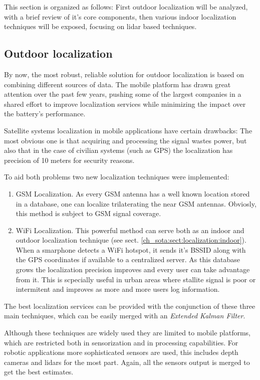     This section is organized as follows: First outdoor localization will be analyzed, with a brief review of it's core components, then various indoor localization techniques will be exposed, focusing on lidar based techniques.

    \subsection{Outdoor localization} \label{ch_sota:sect:localization:outdoor}

      By now, the most robust, reliable solution for outdoor localization is based on combining different sources of data. The mobile platform has drawn great attention over the past few years, pushing some of the largest companies in a shared effort to improve localization services while minimizing the impact over the battery's performance.

      Satellite systems localization in mobile applications have certain drawbacks: The most obvious one is that acquiring and processing the signal wastes power, but also that in the case of civilian systems (such as GPS) the localization has precision of 10 meters for security reasons. 

      To aid both problems two new localization techniques were implemented:
      \begin{enumerate}
        \item GSM Localization. As every GSM antenna has a well known location stored in a database, one can localize trilaterating the near GSM antennas. Obviosly, this method is subject to GSM signal coverage.
        \item WiFi Localization. This powerful method can serve both as an indoor and outdoor localization technique (see sect. \ref{ch_sota:sect:localization:indoor}). When a smarphone detects a WiFi hotspot, it sends it's BSSID along with the GPS coordinates if available to a centralized server. As this database grows the localization precision improves and every user can take advantage from it. This is scpecially useful in urban areas where stallite signal is poor or intermitent and improves as more and more users log information.
      \end{enumerate}

      The best localization services can be provided with the conjunction of these three main techniques, which can be easily merged with an \textit{Extended Kalman Filter}.

      Although these techniques are widely used they are limited to mobile platforms, which are restricted both in sensorization and in processing capabilities. For robotic applications more sophisticated sensors are used, this includes depth cameras and lidars for the most part. Again, all the sensors output is merged to get the best estimates.

